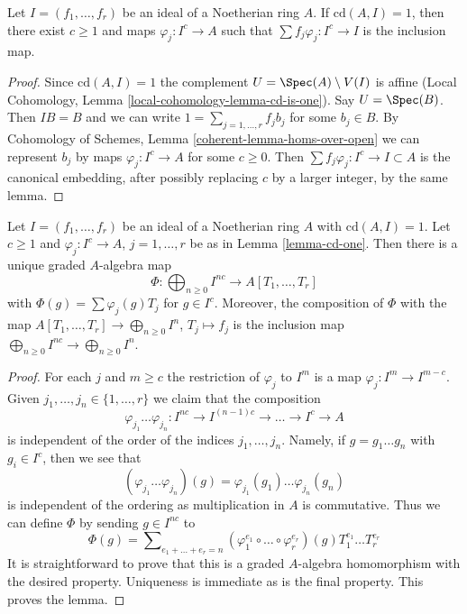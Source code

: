 \begin{lemma}
\label{lemma-cd-one}
Let $I = (f_1, \ldots, f_r)$ be an ideal of a Noetherian ring $A$.
If $\text{cd}(A, I) = 1$, then there exist $c \geq 1$ and maps
$\varphi_j : I^c \to A$ such that $\sum f_j \varphi_j : I^c \to I$
is the inclusion map.
\end{lemma}

\begin{proof}
Since $\text{cd}(A, I) = 1$ the complement $U = \Spec(A) \setminus V(I)$
is affine (Local Cohomology, Lemma \ref{local-cohomology-lemma-cd-is-one}).
Say $U = \Spec(B)$. Then $IB = B$
and we can write $1 = \sum_{j = 1, \ldots, r} f_j b_j$
for some $b_j \in B$. By
Cohomology of Schemes, Lemma \ref{coherent-lemma-homs-over-open}
we can represent $b_j$ by maps $\varphi_j : I^c \to A$
for some $c \geq 0$. Then $\sum f_j \varphi_j : I^c \to I \subset A$
is the canonical embedding, after possibly replacing $c$ by a larger
integer, by the same lemma.
\end{proof}

\begin{lemma}
\label{lemma-cd-one-extend}
Let $I = (f_1, \ldots, f_r)$ be an ideal of a Noetherian ring $A$
with $\text{cd}(A, I) = 1$. Let $c \geq 1$ and $\varphi_j : I^c \to A$,
$j = 1, \ldots, r$ be as in Lemma \ref{lemma-cd-one}.
Then there is a unique graded $A$-algebra map
$$
\Phi : \bigoplus\nolimits_{n \geq 0} I^{nc} \to A[T_1, \ldots, T_r]
$$
with $\Phi(g) = \sum \varphi_j(g) T_j$ for $g \in I^c$.
Moreover, the composition of $\Phi$ with the map
$A[T_1, \ldots, T_r] \to \bigoplus_{n \geq 0} I^n$,
$T_j \mapsto f_j$ is the inclusion map
$\bigoplus_{n \geq 0} I^{nc} \to \bigoplus_{n \geq 0} I^n$.
\end{lemma}

\begin{proof}
For each $j$ and $m \geq c$ the restriction of $\varphi_j$ to
$I^m$ is a map $\varphi_j : I^m \to I^{m - c}$.
Given $j_1, \ldots, j_n \in \{1, \ldots, r\}$ we claim that the
composition
$$
\varphi_{j_1} \ldots \varphi_{j_n} :
I^{nc} \to I^{(n - 1)c} \to \ldots \to I^c \to A
$$
is independent of the order of the indices $j_1, \ldots, j_n$.
Namely, if $g = g_1 \ldots g_n$ with $g_i \in I^c$, then
we see that
$$
(\varphi_{j_1} \ldots \varphi_{j_n})(g) =
\varphi_{j_1}(g_1) \ldots \varphi_{j_n}(g_n)
$$
is independent of the ordering as multiplication in $A$ is commutative.
Thus we can define $\Phi$ by sending $g \in I^{nc}$ to
$$
\Phi(g) = \sum\nolimits_{e_1 + \ldots + e_r = n}
(\varphi_1^{e_1} \circ \ldots \circ \varphi_r^{e_r})(g)
T_1^{e_1} \ldots T_r^{e_r}
$$
It is straightforward to prove that this is a graded $A$-algebra
homomorphism with the desired property. Uniqueness is immediate
as is the final property. This proves the lemma.
\end{proof}


